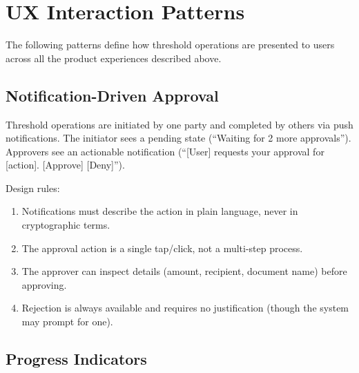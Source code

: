

\section{UX Interaction Patterns}
\label{sec:ux}

The following patterns define how threshold operations are presented to
users across all the product experiences described above.

\subsection{Notification-Driven Approval}

Threshold operations are initiated by one party and completed by others
via push notifications. The initiator sees a pending state (``Waiting for
2 more approvals''). Approvers see an actionable notification (``[User]
requests your approval for [action]. [Approve] [Deny]'').

Design rules:
\begin{enumerate}
    \item Notifications must describe the action in plain language, never
    in cryptographic terms.
    \item The approval action is a single tap/click, not a multi-step process.
    \item The approver can inspect details (amount, recipient, document name)
    before approving.
    \item Rejection is always available and requires no justification (though
    the system may prompt for one).
\end{enumerate}

\subsection{Progress Indicators}

